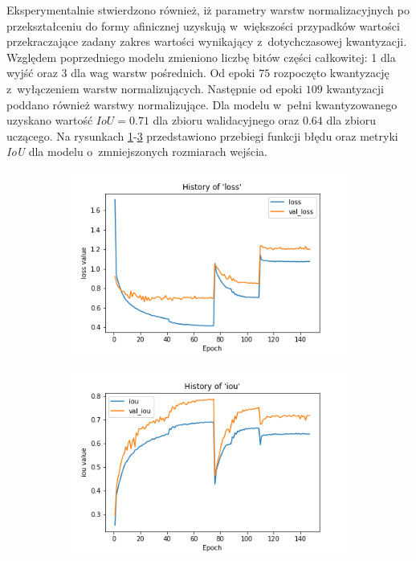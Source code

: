 Eksperymentalnie stwierdzono również, iż parametry warstw normalizacyjnych po przekształceniu do formy afinicznej uzyskują w~większości przypadków wartości przekraczające zadany zakres wartości wynikający z~dotychczasowej kwantyzacji.
Względem poprzedniego modelu zmieniono liczbę bitów części całkowitej: 1 dla wyjść oraz 3 dla wag warstw pośrednich.
Od epoki $75$ rozpoczęto kwantyzację z~wyłączeniem warstw normalizujących.
Następnie od epoki $109$ kwantyzacji poddano również warstwy normalizujące.
Dla modelu w~pełni kwantyzowanego uzyskano wartość $IoU = 0.71$ dla zbioru walidacyjnego oraz $0.64$ dla zbioru uczącego. 
Na rysunkach \ref{fig:small_loss}-\ref{fig:small_iou} przedstawiono przebiegi funkcji błędu oraz metryki \emph{IoU} dla modelu o~zmniejszonych rozmiarach wejścia. 

\begin{figure}
     \centering
     \begin{subfigure}[b]{0.49\textwidth}
         \centering
         \includegraphics[width=\textwidth]{images/LN_smaller_hist_of_loss.png}
         \caption{}
         \label{fig:small_loss}
     \end{subfigure}
     \hfill
     \begin{subfigure}[b]{0.49\textwidth}
         \centering
         \includegraphics[width=\textwidth]{images/LN_smaller_hist_of_iou.png}
         \caption{}
         \label{fig:small_iou}
     \end{subfigure}
     

\end{figure}
